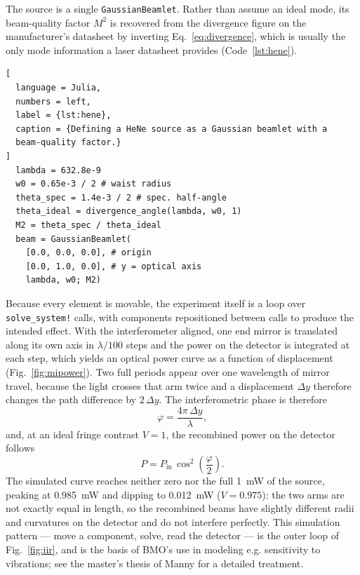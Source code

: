 \documentclass{juliacon}
\begin{document}
The source is a single \texttt{GaussianBeamlet}. Rather than assume an
ideal mode, its beam-quality factor $M^2$ is recovered from the
divergence figure on the manufacturer's datasheet by inverting
Eq.~\ref{eq:divergence}, which is usually the only mode information a
laser datasheet provides (Code~\ref{lst:hene}).

\begin{lstlisting}[
  language = Julia,
  numbers = left,
  label = {lst:hene},
  caption = {Defining a HeNe source as a Gaussian beamlet with a 
  beam-quality factor.} 
]
  lambda = 632.8e-9
  w0 = 0.65e-3 / 2 # waist radius
  theta_spec = 1.4e-3 / 2 # spec. half-angle
  theta_ideal = divergence_angle(lambda, w0, 1)
  M2 = theta_spec / theta_ideal
  beam = GaussianBeamlet(
    [0.0, 0.0, 0.0], # origin 
    [0.0, 1.0, 0.0], # y = optical axis 
    lambda, w0; M2)
\end{lstlisting}

Because every element is movable, the experiment itself is a loop over
\texttt{solve\_system!} calls, with components repositioned between
calls to produce the intended effect. With the interferometer aligned,
one end mirror is translated along its own axis in $\lambda/100$ steps
and the power on the detector is integrated at each step, which yields
an optical power curve as a function of displacement
(Fig.~\ref{fig:mipower}). Two full periods appear over one wavelength of
mirror travel, because the light crosses that arm twice and a
displacement $\Delta y$ therefore changes the path difference by
$2\,\Delta y$. The interferometric phase is therefore
\begin{equation}
\varphi = \frac{4\pi\,\Delta y}{\lambda},
  \label{eq:miphase}
\end{equation}
and, at an ideal fringe contrast $V = 1$, the recombined power on the
detector follows
\begin{equation}
P = P_\mathrm{in}\,\cos^2\!\left(\frac{\varphi}{2}\right).
  \label{eq:mipower}
\end{equation}
The simulated curve reaches neither zero nor the full 1~mW of the
source, peaking at 0.985~mW and dipping to 0.012~mW ($V = 0.975$): the
two arms are not exactly equal in length, so the recombined beams have
slightly different radii and curvatures on the detector and do not
interfere perfectly. This simulation pattern --- move a component,
solve, read the detector --- is the outer loop of Fig.~\ref{fig:iir},
and is the basis of BMO's use in modeling e.g. sensitivity to
vibrations; see the master's thesis of Manny \cite{Manny:2024} for a
detailed treatment.
\end{document}
